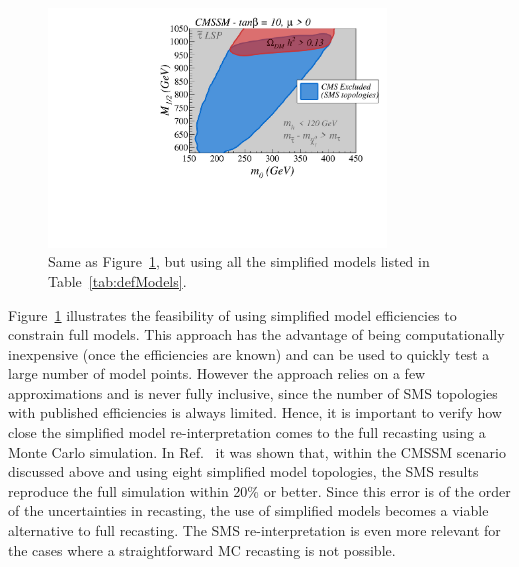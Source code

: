 \begin{figure}[!h]
\centering
\includegraphics[width=0.8\textwidth]{ch5-figures/sms_exclusion_all.pdf}
\caption{Same as Figure~\ref{fig:cmssmB}, but using all the simplified
models listed in Table~\ref{tab:defModels}.
}
\label{fig:cmssmB}
\end{figure}

Figure~\ref{fig:cmssmB} illustrates the feasibility of using simplified
model efficiencies to constrain full models.
This approach has the advantage of being computationally inexpensive
(once the efficiencies are known) and can be used to quickly test
a large number of model points. However the approach relies on a few
approximations and is never fully inclusive, since the number of SMS topologies
with published efficiencies is always limited.
Hence, it is important to verify
how close the simplified model re-interpretation comes to the full recasting
using a Monte Carlo simulation.
In Ref.~\cite{Heisig:2015yla} it was shown that, within
the CMSSM scenario discussed above and using eight simplified model
topologies, the SMS results reproduce the full simulation within
20\% or better.
Since this error is of the order of the uncertainties in recasting,
the use of simplified models becomes a viable alternative to full recasting.
The SMS re-interpretation is even more relevant for the cases
where a straightforward MC recasting is not possible.

\vskip 0.1in
\vskip 0.1in

